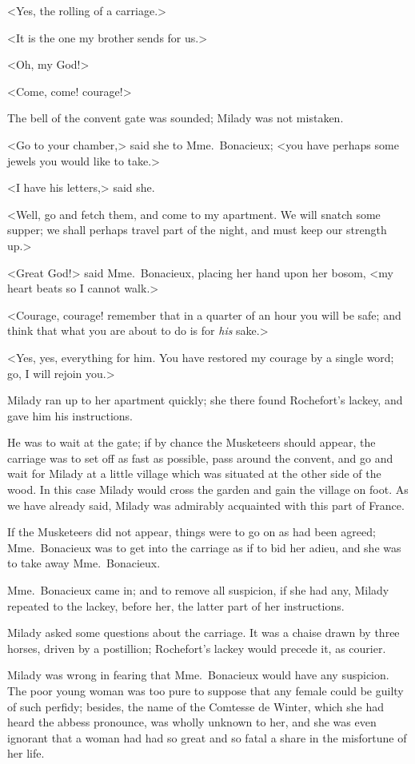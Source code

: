 <Yes, the rolling of a carriage.> 

<It is the one my brother sends for us.> 

<Oh, my God!> 

<Come, come! courage!> 

The bell of the convent gate was sounded; Milady was not mistaken. 

<Go to your chamber,> said she to Mme.~Bonacieux; <you have perhaps some jewels you would like to take.> 

<I have his letters,> said she. 

<Well, go and fetch them, and come to my apartment. We will snatch some supper; we shall perhaps travel part of the night, and must keep our strength up.> 

<Great God!> said Mme.~Bonacieux, placing her hand upon her bosom, <my heart beats so I cannot walk.> 

<Courage, courage! remember that in a quarter of an hour you will be safe; and think that what you are about to do is for \emph{his} sake.> 

<Yes, yes, everything for him. You have restored my courage by a single word; go, I will rejoin you.> 

Milady ran up to her apartment quickly; she there found Rochefort's lackey, and gave him his instructions. 

He was to wait at the gate; if by chance the Musketeers should appear, the carriage was to set off as fast as possible, pass around the convent, and go and wait for Milady at a little village which was situated at the other side of the wood. In this case Milady would cross the garden and gain the village on foot. As we have already said, Milady was admirably acquainted with this part of France. 

If the Musketeers did not appear, things were to go on as had been agreed; Mme.~Bonacieux was to get into the carriage as if to bid her adieu, and she was to take away Mme.~Bonacieux. 

Mme.~Bonacieux came in; and to remove all suspicion, if she had any, Milady repeated to the lackey, before her, the latter part of her instructions. 

Milady asked some questions about the carriage. It was a chaise drawn by three horses, driven by a postillion; Rochefort's lackey would precede it, as courier. 

Milady was wrong in fearing that Mme.~Bonacieux would have any suspicion. The poor young woman was too pure to suppose that any female could be guilty of such perfidy; besides, the name of the Comtesse de Winter, which she had heard the abbess pronounce, was wholly unknown to her, and she was even ignorant that a woman had had so great and so fatal a share in the misfortune of her life. 

